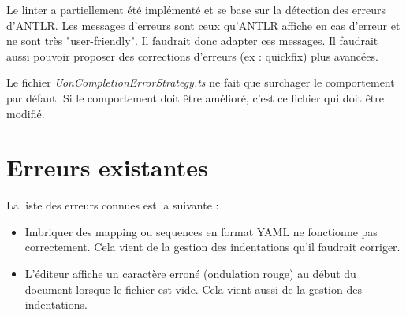 \documentclass[
    iict, %
    il, %
]{heig-tb}
\begin{document}
Le linter a partiellement été implémenté et se base sur la détection des erreurs d'ANTLR.
Les messages d'erreurs sont ceux qu'ANTLR affiche en cas d'erreur et ne sont très "user-friendly". Il faudrait donc adapter ces messages.
Il faudrait aussi pouvoir proposer des corrections d'erreurs (ex : quickfix) plus avancées.

Le fichier \emph{UonCompletionErrorStrategy.ts} ne fait que surchager le comportement par défaut. Si le comportement doit être amélioré, c'est ce fichier qui doit être modifié.

\section{Erreurs existantes}

La liste des erreurs connues est la suivante :

\begin{itemize}
    \item Imbriquer des mapping ou sequences en format YAML ne fonctionne pas correctement. Cela vient de la gestion des indentations qu'il faudrait corriger.
    \item L'éditeur affiche un caractère erroné (ondulation rouge) au début du document lorsque le fichier est vide. Cela vient aussi de la gestion des indentations.
\end{itemize}





\label{glossaire}
\printnoidxglossary
{}

\printbibliography
{}

\end{document}
